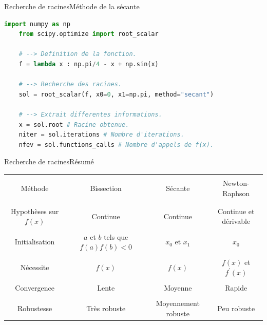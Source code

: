 \documentclass[usenames,dvipsnames,svgnames,10pt,aspectratio=169]{beamer}
\begin{document}
\begin{frame}[t, c, fragile]{Recherche de racines}{Méthode de la sécante}
  \begin{lstlisting}[language=Python]
    import numpy as np
    from scipy.optimize import root_scalar
    
    # --> Definition de la fonction.
    f = lambda x : np.pi/4 - x + np.sin(x)
    
    # --> Recherche des racines.
    sol = root_scalar(f, x0=0, x1=np.pi, method="secant")
    
    # --> Extrait differentes informations.
    x = sol.root # Racine obtenue.
    niter = sol.iterations # Nombre d'iterations.
    nfev = sol.functions_calls # Nombre d'appels de f(x).
  \end{lstlisting}
\end{frame}

\begin{frame}[t, c]{Recherche de racines}{Résumé}
  \centering
  \begin{tabular}{c|ccc}
    \hline \\
    Méthode & Bissection & Sécante & Newton-Raphson \\ \\
    \hline \hline \\
    Hypothèses sur $f(x)$ & Continue & Continue & Continue et dérivable \\ \\
    Initialisation & $a$ et $b$ tels que $f(a) f(b) < 0$ & $x_0$ et $x_1$ & $x_0$ \\ \\
    Nécessite & $f(x)$ & $f(x)$ & $f(x)$ et $f^{\prime}(x)$ \\ \\
    Convergence & {\color{red}Lente} & {\color{orange}Moyenne} & {\color{green} Rapide} \\ \\
    Robustesse & {\color{green} Très robuste} & {\color{orange} Moyennement robuste} & {\color{red} Peu robuste}
  \end{tabular}

  \vspace{1cm}
\end{frame}
\end{document}
